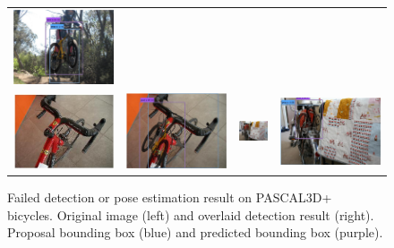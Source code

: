 \documentclass[10pt,twocolumn,letterpaper]{article}
\begin{document}
\begin{figure}[h]
\begin{tabular}{|cc|cc|}
  \includegraphics[width=0.22\linewidth]{supp/pas_bicycle17b.png}  \\ 
  \includegraphics[width=0.22\linewidth]{supp/pas_bicycle18a.png} &
  \includegraphics[width=0.22\linewidth]{supp/pas_bicycle18b.png} & 
  \includegraphics[width=0.22\linewidth]{supp/pas_bicycle19a.png}  &
  \includegraphics[width=0.22\linewidth]{supp/pas_bicycle19b.png}  \\   \hline
  \end{tabular}
\caption{Failed detection or pose estimation result on
  PASCAL3D+~\cite{Xiang14} bicycles. Original image (left) and
  overlaid detection result (right). Proposal bounding box (blue) and
  predicted bounding box (purple).} 
  \label{fig:pascal3d_bicycle_bad}
\end{figure}
\end{document}
